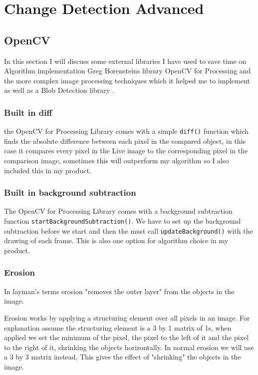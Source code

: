 \documentclass[a4paper]{report}
\begin{document}
\section{Change Detection Advanced}
\subsection{OpenCV}
In this section I will discuss some external libraries I have used to save time on Algorithm implementation Greg Borensteins library OpenCV for Processing \cite{OPENCV} and the more complex image processing techniques which it helped me to implement as well as a Blob Detection library \cite{BLOB}.

\subsubsection{Built in diff}
the OpenCV for Processing Library comes with a simple \verb|diff()| function which finds the absolute difference between each pixel in the compared object, in this case it compares every pixel in the Live image to the corresponding pixel in the comparison image, sometimes this will outperform my algorithm so I also included this in my product.

\subsubsection{Built in background subtraction}
The OpenCV for Processing Library comes with a background subtraction function \verb|startBackgroundSubtraction()|. We have to set up the background subtraction before we start and then the must call \verb|updateBackground()| with the drawing of each frame. This is also one option for algorithm choice in my product.

\subsubsection{Erosion}
In layman's terms erosion "removes the outer layer" from the objects in the image.

Erosion works by applying a structuring element over all pixels in an image. For explanation assume the structuring element is a 3 by 1 matrix of 1s, when applied we set the minimum of the pixel, the pixel to the left of it and the pixel to the right of it, shrinking the objects horizontally. In normal erosion we will use a 3 by 3 matrix instead, This gives the effect of "shrinking" the objects in the image.
\end{document}
